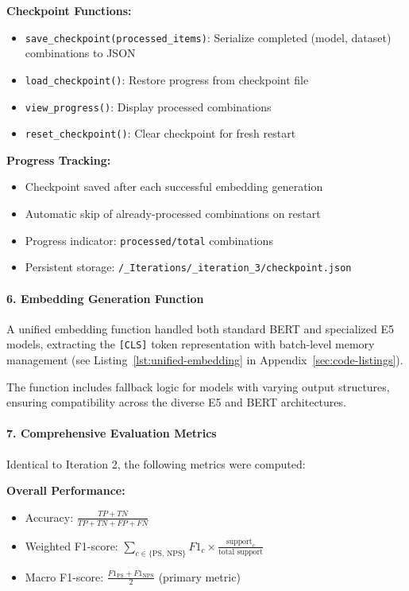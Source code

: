\documentclass[11pt, titlepage, bibliography=totoc]{scrreprt}
\begin{document}
\textbf{Checkpoint Functions:}
\begin{itemize}
    \item \texttt{save\_checkpoint(processed\_items)}: Serialize completed (model, dataset) combinations to JSON
    \item \texttt{load\_checkpoint()}: Restore progress from checkpoint file
    \item \texttt{view\_progress()}: Display processed combinations
    \item \texttt{reset\_checkpoint()}: Clear checkpoint for fresh restart
\end{itemize}

\textbf{Progress Tracking:}
\begin{itemize}
    \item Checkpoint saved after each successful embedding generation
    \item Automatic skip of already-processed combinations on restart
    \item Progress indicator: \texttt{processed/total} combinations
    \item Persistent storage: \texttt{/\_Iterations/\_iteration\_3/checkpoint.json}
\end{itemize}

\paragraph{6. Embedding Generation Function}
A unified embedding function handled both standard BERT and specialized E5 models, extracting the \texttt{[CLS]} token representation with batch-level memory management (see Listing~\ref{lst:unified-embedding} in Appendix~\ref{sec:code-listings}).

The function includes fallback logic for models with varying output structures, ensuring compatibility across the diverse E5 and BERT architectures.

\paragraph{7. Comprehensive Evaluation Metrics}
Identical to Iteration 2, the following metrics were computed:

\textbf{Overall Performance:}
\begin{itemize}
    \item Accuracy: $\frac{TP + TN}{TP + TN + FP + FN}$
    \item Weighted F1-score: $\sum_{c \in \{\text{PS, NPS}\}} F1_c \times \frac{\text{support}_c}{\text{total support}}$
    \item Macro F1-score: $\frac{F1_{\text{PS}} + F1_{\text{NPS}}}{2}$ (primary metric)
\end{itemize}
\end{document}
